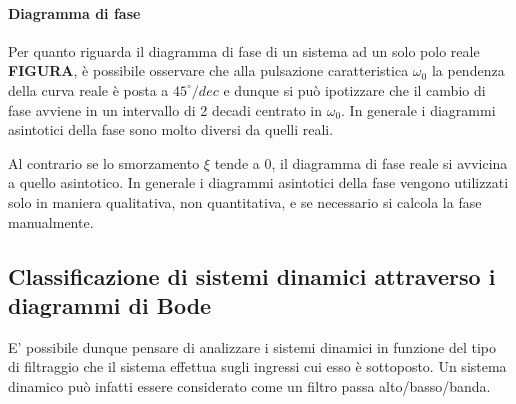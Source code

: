 			
			\paragraph{Diagramma di fase} Per quanto riguarda il diagramma di fase di un sistema ad un solo polo reale \textbf{FIGURA}, è possibile osservare che alla pulsazione caratteristica $\omega_0$ la pendenza  della curva reale è posta a $45^\circ/dec$ e dunque si può ipotizzare che il cambio di fase avviene in un intervallo di 2 decadi centrato in $\omega_0$. In generale i diagrammi asintotici della fase sono molto diversi da quelli reali.
			
			Al contrario se lo smorzamento $\xi$ tende a $0$, il diagramma di fase reale si avvicina a quello asintotico. In generale i diagrammi asintotici della fase vengono utilizzati solo in maniera qualitativa, non quantitativa, e se necessario si calcola la fase manualmente.
			
	\subsection{Classificazione di sistemi dinamici attraverso i diagrammi di Bode}
		E' possibile dunque pensare di analizzare i sistemi dinamici in funzione del tipo di filtraggio che il sistema effettua sugli ingressi cui esso è sottoposto. Un sistema dinamico può infatti essere considerato come un filtro passa alto/basso/banda.
			
			
			
			
			
			
			
			
			
			
			
			
			
			
			
			
			
			
			
			
			
			
			
		
		
		
		
		
		
		